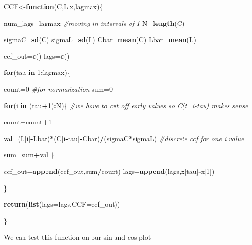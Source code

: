 \documentclass[]{article}
\newenvironment{Shaded}{\begin{snugshade}}{\end{snugshade}}
\newcommand{\CommentTok}[1]{\textcolor[rgb]{0.56,0.35,0.01}{\textit{#1}}}
\newcommand{\ControlFlowTok}[1]{\textcolor[rgb]{0.13,0.29,0.53}{\textbf{#1}}}
\newcommand{\DataTypeTok}[1]{\textcolor[rgb]{0.13,0.29,0.53}{#1}}
\newcommand{\DecValTok}[1]{\textcolor[rgb]{0.00,0.00,0.81}{#1}}
\newcommand{\KeywordTok}[1]{\textcolor[rgb]{0.13,0.29,0.53}{\textbf{#1}}}
\newcommand{\NormalTok}[1]{#1}
\newcommand{\OperatorTok}[1]{\textcolor[rgb]{0.81,0.36,0.00}{\textbf{#1}}}
\begin{document}
\begin{Shaded}
\begin{Highlighting}[]
\NormalTok{CCF<-}\ControlFlowTok{function}\NormalTok{(C,L,x,lagmax)\{}
  
\NormalTok{  num_lags=lagmax }\CommentTok{#moving in intervals of 1}
\NormalTok{  N=}\KeywordTok{length}\NormalTok{(C)}

\NormalTok{  sigmaC=}\KeywordTok{sd}\NormalTok{(C)}
\NormalTok{  sigmaL=}\KeywordTok{sd}\NormalTok{(L)}
\NormalTok{  Cbar=}\KeywordTok{mean}\NormalTok{(C)}
\NormalTok{  Lbar=}\KeywordTok{mean}\NormalTok{(L)}
  
\NormalTok{  ccf_out=}\KeywordTok{c}\NormalTok{()}
\NormalTok{  lags=}\KeywordTok{c}\NormalTok{()}
  

  \ControlFlowTok{for}\NormalTok{(tau }\ControlFlowTok{in} \DecValTok{1}\OperatorTok{:}\NormalTok{lagmax)\{}
    
    
\NormalTok{    count=}\DecValTok{0} \CommentTok{#for normalization}
\NormalTok{    sum=}\DecValTok{0}

    \ControlFlowTok{for}\NormalTok{(i }\ControlFlowTok{in}\NormalTok{ (tau}\OperatorTok{+}\DecValTok{1}\NormalTok{)}\OperatorTok{:}\NormalTok{N)\{ }\CommentTok{#we have to cut off early values so C(t_i-tau) makes sense}
      
\NormalTok{      count=count}\OperatorTok{+}\DecValTok{1}

\NormalTok{      val=(L[i]}\OperatorTok{-}\NormalTok{Lbar)}\OperatorTok{*}\NormalTok{(C[i}\OperatorTok{-}\NormalTok{tau]}\OperatorTok{-}\NormalTok{Cbar)}\OperatorTok{/}\NormalTok{(sigmaC}\OperatorTok{*}\NormalTok{sigmaL) }\CommentTok{#discrete ccf for one i value}

\NormalTok{      sum=sum}\OperatorTok{+}\NormalTok{val}
\NormalTok{    \}}
    

\NormalTok{    ccf_out=}\KeywordTok{append}\NormalTok{(ccf_out,sum}\OperatorTok{/}\NormalTok{count)}
\NormalTok{    lags=}\KeywordTok{append}\NormalTok{(lags,x[tau]}\OperatorTok{-}\NormalTok{x[}\DecValTok{1}\NormalTok{])}
  
\NormalTok{  \}}

  
  \KeywordTok{return}\NormalTok{(}\KeywordTok{list}\NormalTok{(}\DataTypeTok{lags=}\NormalTok{lags,}\DataTypeTok{CCF=}\NormalTok{ccf_out))}
  
\NormalTok{\}}
\end{Highlighting}
\end{Shaded}

We can test this function on our sin and cos plot
\end{document}
